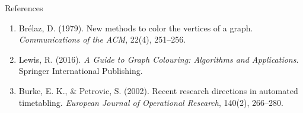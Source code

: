 \documentclass[11pt,a4paper]{article}
\newcommand{\blueheading}[1]{%
    {\sffamily\color{TitleBlue}\fontsize{15}{18}\selectfont #1}%
}
\newcommand{\answerbox}[2][]{%
    \vspace{2pt}\par
    \noindent
    {\itshape #2}\par
    \vspace{2pt}
}
\begin{document}
\vspace{5mm}

\blueheading{References}

\vspace{1mm}


\answerbox{%
\begin{enumerate}[leftmargin=*,noitemsep,topsep=0pt]
    \item Br\'elaz, D. (1979). New methods to color the vertices of a graph. \textit{Communications of the ACM}, 22(4), 251--256.
    \item Lewis, R. (2016). \textit{A Guide to Graph Colouring: Algorithms and Applications}. Springer International Publishing.
    \item Burke, E. K., \& Petrovic, S. (2002). Recent research directions in automated timetabling. \textit{European Journal of Operational Research}, 140(2), 266--280.
\end{enumerate}
}
\end{document}
